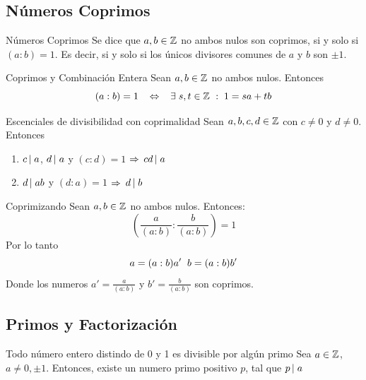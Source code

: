 \documentclass[10pt]{article}
\begin{document}
\begin{center}
\subsection{Números Coprimos} 
\end{center}


\begin{defi}{Números Coprimos}
 Se dice que $a,b \in \entero{}$ no ambos nulos son coprimos, si y solo si $(a:b)=1$. Es decir, si y solo si los únicos divisores comunes de $a$ y $b$ son $\pm 1$.
\end{defi}

\begin{obs}{Coprimos y Combinación Entera}
 Sean $a,b \in \entero{}$ no ambos nulos. Entonces
 \[ (a:b)=1 \es{0.3} \sii \es{0.3} \exists \es{0.1} s,t \in \entero{}\es{0.1} :\es{0.1} 1 = s a + t b\]
\end{obs}

\begin{prop}{Escenciales de divisibilidad con coprimalidad}
Sean $a,b,c,d \in \entero{}$ con $c \neq 0$ y $d \neq 0$. Entonces
 
\begin{enumerate}
 \item $\divi{c}{a}$, $\divi{d}{a}$ y $(c:d)=1$ $\implica$ $\divi{c d}{a}$
 \item $\divi{d}{a b}$ y $(d:a)=1$ $\implica$ $\divi{d}{b}$
\end{enumerate}
\end{prop}

\begin{propo}{Coprimizando}
 Sean $a,b \in \entero{}$ no ambos nulos. Entonces:
 \[\left(\frac{a}{(a:b)} : \frac{b}{(a:b)}\right) = 1\]
 Por lo tanto
 \[a = (a:b)a' \es{0.2} b = (a:b)b'\]
 Donde los numeros $a' = \frac{a}{(a:b)}$ y $b' = \frac{b}{(a:b)}$ son coprimos.
\end{propo}

\begin{center}
\subsection{Primos y Factorización}   
\end{center}

\begin{propo}{Todo número entero distindo de 0 y  1 es divisible por algún primo}
 Sea $a \in \entero{}$, $a \neq 0, \pm 1$. Entonces, existe un numero primo positivo $p$, tal que $\divi{p}{a}$
\end{propo}
\end{document}
